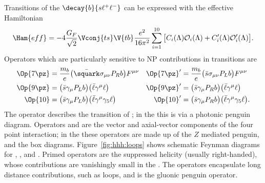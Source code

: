 Transitions of the \fcnc $\decay{b}{s\ell^+\ell^-}$ can be expressed with the effective Hamiltonian
\begin{equation}
  \Ham{eff} = -4\frac{G_F}{\sqrt{2}}\Vconj{ts}\V{tb}\frac{e^2}{16\pi^2}
  \sum_{i=1}^{10}\big[C_i(\Lambda)\mathcal{O}_i(\Lambda)
    +C_i^\prime(\Lambda)\mathcal{O}_i^\prime(\Lambda)\big].
\end{equation}
Operators which are particularly sensitive to NP contributions in  transitions are
\begin{align}
  \Op{7\pz} &= \frac{m_b}{e}\big(\bar\squark\sigma_{\mu\nu}P_Rb\big)F^{\mu\nu}
  &\Op{7\pz}^\prime &= \frac{m_b}{e}\big(\bar s \sigma_{\mu\nu}P_Lb\big)F^{\mu\nu}
  \nonumber\\
  \Op{9\pz} &= \big(\bar s\gamma_\mu P_Lb\big)\big(\bar\ell\gamma^\mu\ell\big)
  &\Op{9\pz}^\prime &= \big(\bar s\gamma_\mu P_Rb\big)\big(\bar\ell\gamma^\mu\ell\big)
  \nonumber\\
  \Op{10} &= \big(\bar s\gamma_\mu P_Lb\big)\big(\bar\ell\gamma^\mu\gamma_5\ell\big)
  &\Op{10}^\prime &= \big(\bar s\gamma_\mu P_Rb\big)\big(\bar\ell\gamma^\mu\gamma_5\ell\big).
\end{align}
The operator  describes the transition of \decay{\bquark}{\squark\gamma}; in the \sm this is
via a photonic penguin diagram.
Operators  and  are the vector and axial-vector components of the four point
\decay{\bquark}{\squark\mumu} interaction; in the \sm these operators are made up of the $Z$
mediated penguin, and the \Wp box diagrams.
Figure~\ref{fig:hhh:loops} shows schematic Feynman diagrams for , , and .
Primed operators are the suppressed helicity (usually right-handed), whose contributions are
vanishingly small in the \sm.
The operators  encapsulate long distance contributions, such as \ccbar
loops, and  is the gluonic penguin operator.


